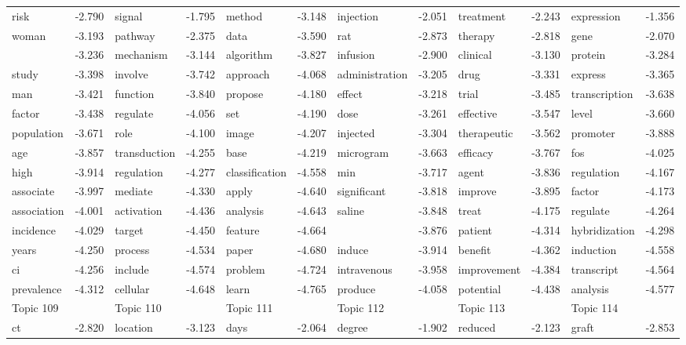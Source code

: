 \documentclass{article}
\begin{document}
\begin{table}
{\begin{tabular}{|l r|l r|l r|l r|l r|l r|}
\hline
risk & -2.790 & signal & -1.795 & method & -3.148 & injection & -2.051 & treatment & -2.243 & expression & -1.356\\
woman & -3.193 & pathway & -2.375 & data & -3.590 & rat & -2.873 & therapy & -2.818 & gene & -2.070\\
 & -3.236 & mechanism & -3.144 & algorithm & -3.827 & infusion & -2.900 & clinical & -3.130 & protein & -3.284\\
study & -3.398 & involve & -3.742 & approach & -4.068 & administration & -3.205 & drug & -3.331 & express & -3.365\\
man & -3.421 & function & -3.840 & propose & -4.180 & effect & -3.218 & trial & -3.485 & transcription & -3.638\\
factor & -3.438 & regulate & -4.056 & set & -4.190 & dose & -3.261 & effective & -3.547 & level & -3.660\\
population & -3.671 & role & -4.100 & image & -4.207 & injected & -3.304 & therapeutic & -3.562 & promoter & -3.888\\
age & -3.857 & transduction & -4.255 & base & -4.219 & microgram & -3.663 & efficacy & -3.767 & fos & -4.025\\
high & -3.914 & regulation & -4.277 & classification & -4.558 & min & -3.717 & agent & -3.836 & regulation & -4.167\\
associate & -3.997 & mediate & -4.330 & apply & -4.640 & significant & -3.818 & improve & -3.895 & factor & -4.173\\
association & -4.001 & activation & -4.436 & analysis & -4.643 & saline & -3.848 & treat & -4.175 & regulate & -4.264\\
incidence & -4.029 & target & -4.450 & feature & -4.664 &  & -3.876 & patient & -4.314 & hybridization & -4.298\\
years & -4.250 & process & -4.534 & paper & -4.680 & induce & -3.914 & benefit & -4.362 & induction & -4.558\\
ci & -4.256 & include & -4.574 & problem & -4.724 & intravenous & -3.958 & improvement & -4.384 & transcript & -4.564\\
prevalence & -4.312 & cellular & -4.648 & learn & -4.765 & produce & -4.058 & potential & -4.438 & analysis & -4.577\\
\hline
\hline
Topic 109 & &Topic 110 & &Topic 111 & &Topic 112 & &Topic 113 & &Topic 114 &\\
\hline
ct & -2.820 & location & -3.123 & days & -2.064 & degree & -1.902 & reduced & -2.123 & graft & -2.853\\

\end{tabular}}
\end{table}
\end{document}
